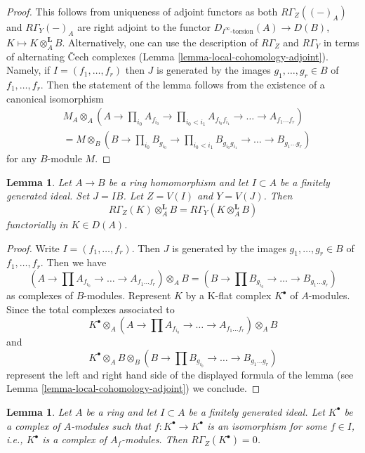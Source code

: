 \documentclass{stacks-project}
\theoremstyle{plain}
\newtheorem{lemma}[subsection]{Lemma}
\theoremstyle{definition}
\theoremstyle{remark}
\numberwithin{equation}{subsection}
\begin{document}
\begin{proof}
This follows from uniqueness of adjoint functors as both
$R\Gamma_Z((-)_A)$ and $R\Gamma_Y(-)_A$
are right adjoint to the functor $D_{I^\infty\text{-torsion}}(A) \to D(B)$,
$K \mapsto K \otimes_A^\mathbf{L} B$.
Alternatively, one can use the description of $R\Gamma_Z$ and $R\Gamma_Y$
in terms of alternating {\v C}ech complexes
(Lemma \ref{lemma-local-cohomology-adjoint}).
Namely, if $I = (f_1, \ldots, f_r)$ then $J$ is generated by the images
$g_1, \ldots, g_r \in B$ of $f_1, \ldots, f_r$.
Then the statement of the lemma follows from the existence of
a canonical isomorphism
\begin{align*}
& M_A \otimes_A (A \to \prod\nolimits_{i_0} A_{f_{i_0}} \to
\prod\nolimits_{i_0 < i_1} A_{f_{i_0}f_{i_1}}
\to \ldots \to A_{f_1\ldots f_r}) \\
& = 
M \otimes_B (B \to \prod\nolimits_{i_0} B_{g_{i_0}} \to
\prod\nolimits_{i_0 < i_1} B_{g_{i_0}g_{i_1}}
\to \ldots \to B_{g_1\ldots g_r})
\end{align*}
for any $B$-module $M$.
\end{proof}

\begin{lemma}
\label{lemma-torsion-change-rings}
Let $A \to B$ be a ring homomorphism and let $I \subset A$
be a finitely generated ideal. Set $J = IB$. Let $Z = V(I)$ and $Y = V(J)$.
Then
$$
R\Gamma_Z(K) \otimes_A^\mathbf{L} B = R\Gamma_Y(K \otimes_A^\mathbf{L} B)
$$
functorially in $K \in D(A)$.
\end{lemma}

\begin{proof}
Write $I = (f_1, \ldots, f_r)$. Then $J$ is generated by the images
$g_1, \ldots, g_r \in B$ of $f_1, \ldots, f_r$. Then we have
$$
(A \to \prod A_{f_{i_0}} \to \ldots \to A_{f_1\ldots f_r}) \otimes_A B =
(B \to \prod B_{g_{i_0}} \to \ldots \to B_{g_1\ldots g_r})
$$
as complexes of $B$-modules. Represent $K$ by a K-flat complex $K^\bullet$
of $A$-modules. Since the total complexes associated to
$$
K^\bullet \otimes_A
(A \to \prod A_{f_{i_0}} \to \ldots \to A_{f_1\ldots f_r}) \otimes_A B
$$
and
$$
K^\bullet \otimes_A B \otimes_B
(B \to \prod B_{g_{i_0}} \to \ldots \to B_{g_1\ldots g_r})
$$
represent the left and right hand side of the displayed formula of the
lemma (see Lemma \ref{lemma-local-cohomology-adjoint}) we conclude.
\end{proof}

\begin{lemma}
\label{lemma-local-cohomology-vanishes}
Let $A$ be a ring and let $I \subset A$ be a finitely generated ideal.
Let $K^\bullet$ be a complex of $A$-modules such that
$f : K^\bullet \to K^\bullet$ is an isomorphism for some
$f \in I$, i.e., $K^\bullet$ is a complex of $A_f$-modules. Then
$R\Gamma_Z(K^\bullet) = 0$.
\end{lemma}
\end{document}
